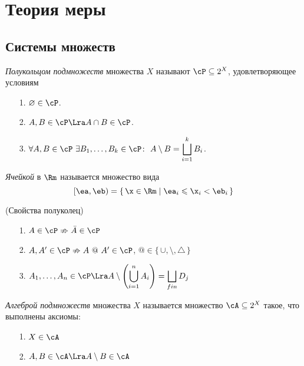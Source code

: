 \chapter{Теория меры}

\section{Системы множеств}

\begin{definition}
    \textit{Полукольцом подмножеств} множества $X$ называют $\cP \subseteq 2^X$,
    удовлетворяющее условиям
    \begin{itemize}
        \item[1.] $\varnothing \in \cP$.
        \item[2.] $A, B \in \cP \Lra A \cap B \in \cP$.
        \item[3.] $\displaystyle \forall A, B \in \cP~ \exists B_1, \ldots,
        B_k \in \cP\colon~ A \setminus B = \bigsqcup_{i = 1}^{k}{B_i}$.
    \end{itemize}
\end{definition}

\begin{definition}
    \textit{Ячейкой} в $\Rm$ называется множество вида
\[
    [\ea, \eb) = \{\, \x \in \Rm \mid \ea_i \leqslant \x_i < \eb_i \,\}
\]
\end{definition}

\begin{theorem}(Свойства полуколец)
    \begin{itemize}
        \item[1.] $A \in \cP \nRightarrow \bar{A} \in \cP$
        \item[2.] $A, A' \in \cP \nRightarrow A~@~A' \in \cP$, $@ \in
        \{\, \cup, \setminus, \triangle \,\}$
        \item[3.] $\displaystyle A_1, \ldots, A_n \in \cP \Lra A \setminus
        \left(\bigcup_{i = 1}^{n}{A_i}\right) = \bigsqcup_{fin}{D_j}$
    \end{itemize}
\end{theorem}

\begin{definition}
    \textit{Алгеброй подмножеств} множества $X$ называется множество $\cA \subseteq
    2^X$ такое, что выполнены аксиомы:
    \begin{itemize}
        \item[1.] $X \in \cA$
        \item[2.] $A, B \in \cA \Lra A \setminus B \in \cA$
    \end{itemize}
\end{definition}

